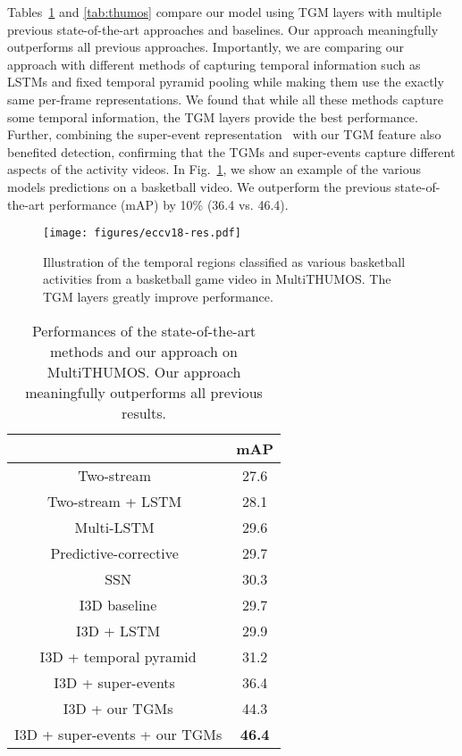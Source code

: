 \documentclass{article}
\begin{document}
Tables~\ref{tab:multithumos} and \ref{tab:thumos} compare our model using TGM layers with multiple previous state-of-the-art approaches and baselines. Our approach meaningfully outperforms all previous approaches. Importantly, we are comparing our approach with different methods of capturing temporal information such as LSTMs and fixed temporal pyramid pooling while making them use the exactly same per-frame representations. We found that while all these methods capture some temporal information, the TGM layers provide the best performance. Further, combining the super-event representation~\citep{piergiovanni2018super} with our TGM feature also benefited detection, confirming that the TGMs and super-events capture different aspects of the activity videos. In Fig.~\ref{fig:multithumos-res}, we show an example of the various models predictions on a basketball video. We outperform the previous state-of-the-art performance (mAP) by 10\% (36.4 vs. 46.4).




\begin{figure}
    \centering
    \texttt{[image: figures/eccv18-res.pdf]}
    \caption{Illustration of the temporal regions classified as various basketball activities from a basketball game video in MultiTHUMOS. The TGM layers greatly improve performance.}
    \label{fig:multithumos-res}
\end{figure}


\begin{table}
\caption{Performances of the state-of-the-art methods and our approach on MultiTHUMOS. Our approach meaningfully outperforms all previous results.}
\label{tab:multithumos}
\centering
\setlength\extrarowheight{0pt}
\begin{tabular}{c|c}
\toprule
 & mAP \\
\midrule
Two-stream~\citep{yeung2015every}    & 27.6\\
Two-stream + LSTM~\citep{yeung2015every}          & 28.1\\
Multi-LSTM~\citep{yeung2015every}    & 29.6\\
Predictive-corrective~\citep{dave2017predictive} & 29.7\\
SSN \cite{zhao2017temporal} & 30.3 \\
I3D baseline                         & 29.7 \\
I3D + LSTM                           & 29.9 \\
I3D + temporal pyramid               & 31.2 \\
I3D + super-events~\citep{piergiovanni2018super}            & 36.4 \\
I3D + our TGMs                       & 44.3 \\
I3D + super-events + our TGMs        & \bf{46.4} \\
\bottomrule
\end{tabular}
\end{table}
\end{document}
